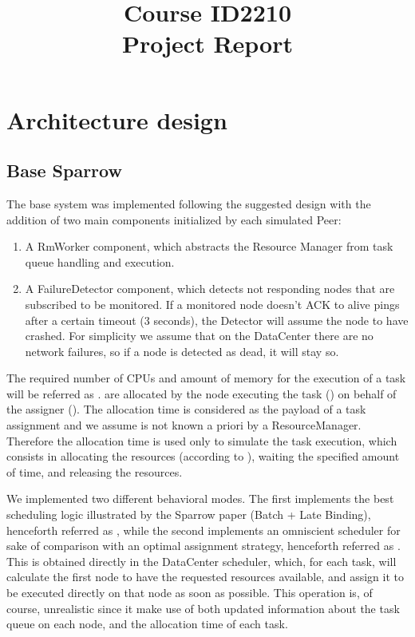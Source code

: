 \documentclass[conference]{IEEEtran}
\title{
  Course ID2210\\
  Project Report
}
\author{
  \IEEEauthorblockN{Riccardo Reale}
  \IEEEauthorblockA{Peerialism AB\\
    {riccardo.reale@peerialism.com}\\
    \url{https://github.com/riccardoreale/id2210-vt14.git}
  }
  \and
  \IEEEauthorblockN{Giovanni Simoni}
  \IEEEauthorblockA{Peerialism AB\\
    {giovanni.simoni@peerialism.com}\\
    \url{https://github.com/dacav/id2210-vt14.git}
  }
}
\begin{document}
\maketitle

\section{Architecture design}

  \subsection{Base Sparrow}
  
  The base system was implemented following the suggested design with the addition of 
  two main components initialized by each simulated Peer:
  \begin{enumerate}

  \item A RmWorker component, which abstracts the Resource Manager from task queue
  handling and execution.
  
  \item A FailureDetector component, which detects not responding nodes that are subscribed to be
  monitored. If a monitored node doesn't ACK to alive pings after a certain timeout (3 seconds), the Detector will assume the node to have crashed. For simplicity we assume that on the DataCenter there are no network failures, so if a node is detected as dead, it will stay so.
  
  \end{enumerate}
  
   The required number of CPUs and amount of memory for the execution of a
  task will be referred as \treq. \Treq are allocated by the node executing the
  task (\exc) on behalf of the assigner (\tmast). The allocation time is
  considered as the payload of a task assignment and we assume is not known a priori by a ResourceManager. Therefore the allocation time is used only to simulate the task execution, which consists in allocating the resources (according to \treq), waiting the
  specified amount of time, and releasing the resources.

  We implemented two different behavioral modes. The first implements
  the best scheduling logic illustrated by the Sparrow paper (Batch + Late Binding),
  henceforth referred as \us, while the second implements
  an omniscient scheduler for sake of comparison with an optimal assignment
  strategy, henceforth referred as \omni. This is obtained directly in the DataCenter scheduler, which, for each task, will calculate the first node to have the requested resources available, and assign it to be executed directly on that node as soon as possible. This operation is, of course, unrealistic since it make use of both updated information about the task queue on each node, and the allocation time of each task.
  
\end{document}
